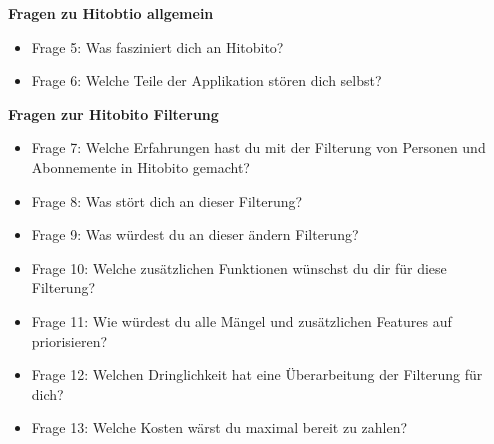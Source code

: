 \textbf{Fragen zu Hitobtio allgemein}
\begin{itemize}
   \item Frage 5: Was fasziniert dich an Hitobito?
   \item Frage 6: Welche Teile der Applikation stören dich selbst?
\end{itemize}

\textbf{Fragen zur Hitobito Filterung}
\begin{itemize}
   \item Frage 7: Welche Erfahrungen hast du mit der Filterung von Personen und Abonnemente in Hitobito gemacht?
   \item Frage 8: Was stört dich an dieser Filterung?
   \item Frage 9: Was würdest du an dieser ändern Filterung?
   \item Frage 10: Welche zusätzlichen Funktionen wünschst du dir für diese Filterung?
   \item Frage 11: Wie würdest du alle Mängel und zusätzlichen Features auf priorisieren?
   \item Frage 12: Welchen Dringlichkeit hat eine Überarbeitung der Filterung für dich?
   \item Frage 13: Welche Kosten wärst du maximal bereit zu zahlen?
\end{itemize}

\newpage

